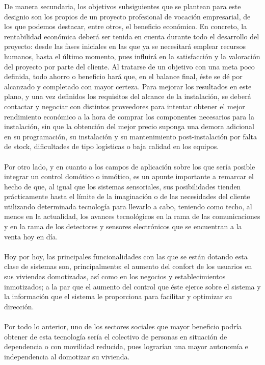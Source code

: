 De manera secundaria, los objetivos subsiguientes que se plantean para este designio son los propios de un proyecto profesional de vocación empresarial, de los que podemos destacar, entre otros, el beneficio económico. En concreto, la rentabilidad económica deberá ser tenida en cuenta durante todo el desarrollo del proyecto: desde las fases iniciales en las que ya se necesitará emplear recursos humanos, hasta el último momento, pues influirá en la satisfacción y la valoración del proyecto por parte del cliente. Al tratarse de un objetivo con una meta poco definida, todo ahorro o beneficio hará que, en el balance final, éste se dé por alcanzado y completado con mayor certeza. Para mejorar los resultados en este plano, y una vez definidos los requisitos del alcance de la instalación, se deberá contactar y negociar con distintos proveedores para intentar obtener el mejor rendimiento económico a la hora de comprar los componentes necesarios para la instalación, sin que la obtención del mejor precio suponga una demora adicional en su programación, su instalación y su mantenimiento post-instalación por falta de stock, dificultades de tipo logísticas o baja calidad en los equipos.\\\\
 
Por otro lado, y en cuanto a los campos de aplicación sobre los que sería posible integrar un control domótico o inmótico, es un apunte importante a remarcar el hecho de que, al igual que los sistemas sensoriales, sus posibilidades tienden prácticamente hasta el límite de la imaginación o de las necesidades del cliente utilizando determinada tecnología para llevarlo a cabo, teniendo como techo, al menos en la actualidad, los avances tecnológicos en la rama de las comunicaciones y en la rama de los detectores y sensores electrónicos que se encuentran a la venta hoy en día. \\\\ 
Hoy por hoy, las principales funcionalidades con las que se están dotando esta clase de sistemas son, principalmente: el aumento del confort de los usuarios en sus viviendas domotizadas, así como en los negocios y establecimientos inmotizados; a la par que el aumento del control que éste ejerce sobre el sistema y la información que el sistema le proporciona para facilitar y optimizar su dirección. \\\\
Por todo lo anterior, uno de los sectores sociales que mayor beneficio podría obtener de esta tecnología sería el colectivo de personas en situación de dependencia o con movilidad reducida, pues lograrían una mayor autonomía e independencia al domotizar su vivienda.



